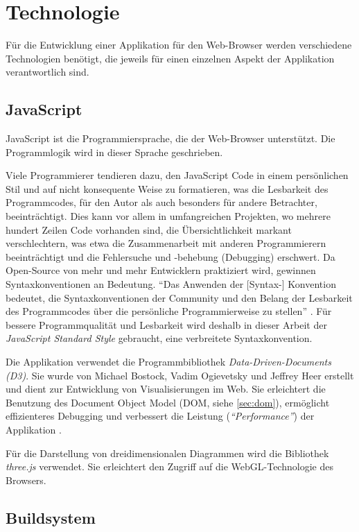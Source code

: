 \section{Technologie}

Für die Entwicklung einer Applikation für den Web-Browser werden verschiedene Technologien benötigt, die jeweils für einen einzelnen Aspekt der Applikation verantwortlich sind.

\subsection{JavaScript}

JavaScript ist die Programmiersprache, die der Web-Browser unterstützt. Die Programmlogik wird in dieser Sprache geschrieben.

Viele Programmierer tendieren dazu, den JavaScript Code in einem persönlichen Stil und auf nicht konsequente Weise zu formatieren, was die Lesbarkeit des Programmcodes, für den Autor als auch besonders für andere Betrachter, beeinträchtigt. Dies kann vor allem in umfangreichen Projekten, wo mehrere hundert Zeilen Code vorhanden sind, die Übersichtlichkeit markant verschlechtern, was etwa die Zusammenarbeit mit anderen Programmierern beeinträchtigt und die Fehlersuche und -behebung (Debugging) erschwert. Da Open-Source von mehr und mehr Entwicklern praktiziert wird, gewinnen Syntaxkonventionen an Bedeutung. "`Das Anwenden der [Syntax-] Konvention bedeutet, die Syntaxkonventionen der Community und den Belang der Lesbarkeit des Programmcodes über die persönliche Programmierweise zu stellen"' \cite{feross}. Für bessere Programmqualität und Lesbarkeit wird deshalb in dieser Arbeit der \textit{JavaScript Standard Style} gebraucht, eine verbreitete Syntaxkonvention.

Die Applikation verwendet die Programmbibliothek \textit{Data-Driven-Documents (D3)}. Sie wurde von Michael Bostock, Vadim Ogievetsky und Jeffrey Heer erstellt und dient zur Entwicklung von Visualisierungen im Web. Sie erleichtert die Benutzung des Document Object Model (DOM, siehe \ref{sec:dom}), ermöglicht effizienteres Debugging und verbessert die Leistung (\textit{"`Performance"'}) der Applikation \cite[Kapitel 1]{bostock}.

Für die Darstellung von dreidimensionalen Diagrammen wird die Bibliothek \textit{three.js} \cite{threejs} verwendet. Sie erleichtert den Zugriff auf die WebGL-Technologie des Browsers.

\subsection{Buildsystem}

